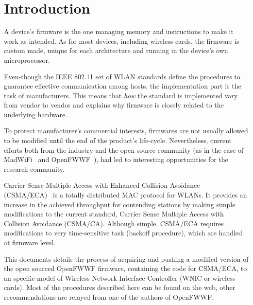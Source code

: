 \documentclass[conference]{IEEEtran}
\begin{document}

\section{Introduction}\label{introduction}
A device's firmware is the one managing memory and instructions to make it work as intended. As for most devices, including wireless cards, the firmware is custom made, unique for each architecture and running in the device's own microprocessor.

Even-though the IEEE 802.11 set of WLAN standards define the procedures to guarantee effective communication among hosts, the implementation part is the task of manufacturers. This means that \emph{how} the standard is implemented vary from vendor to vendor and explains why firmware is closely related to the underlying hardware.


To protect manufacturer's commercial interests, firmwares are not usually allowed to be modified until the end of the product's life-cycle. Nevertheless, current efforts both from the industry and the open source community (as in the case of MadWiFi~\cite{madWiFi} and OpenFWWF~\cite{OpenFWWF}), had led to interesting opportunities for the research community.

Carrier Sense Multiple Access with Enhanced Collision Avoidance (CSMA/ECA)~\cite{barcelo2008lba} is a totally distributed MAC protocol for WLANs. It provides an increase in the achieved throughput for contending stations by making simple modifications to the current standard, Carrier Sense Multiple Access with Collision Avoidance (CSMA/CA). Although simple, CSMA/ECA requires modifications to very time-sensitive task (backoff procedure), which are handled at firmware level.

This documents details the process of acquiring and pushing a modified version of the open sourced OpenFWWF firmware, containing the code for CSMA/ECA, to an specific model of Wireless Network Interface Controller (WNIC or wireless cards). Most of the procedures described here can be found on the web, other recommendations are relayed from one of the authors of OpenFWWF.

\end{document}
